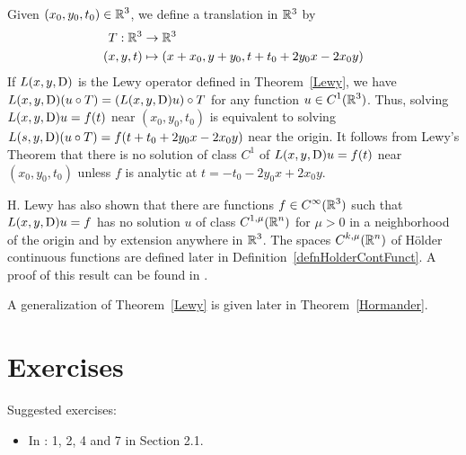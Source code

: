 \begin{rmk}
Given $\displaystyle (x_0,y_0,t_0) \in \mathbb{R}^3$, we define a translation
in $\mathbb{R}^3$ by
\begin{align*}
T:\mathbb{R}^3 &\to \mathbb{R}^3 \\
 (x,y,t) &\mapsto (x+x_0,y+y_0, t+t_0 +2y_0x - 2x_0 y)
\end{align*}
If $L(x,y,\operatorname{D})$ is the Lewy operator defined in Theorem~\ref{Lewy}, we have
$\displaystyle L(x,y,\operatorname{D})(u \circ T) = \left(L(x,y,\operatorname{D})u\right) \circ T$
for any function $\displaystyle u \in C^1(\mathbb{R}^3)$.
Thus, solving $L(x,y,\operatorname{D})u = f(t)$ near $(x_0,y_0,t_0)$ is
equivalent to solving $L(s,y,\operatorname{D})(u\circ T) = f(t+t_0+2y_0x - 2x_0y)$
near the origin.  It follows from Lewy's Theorem that there is no solution of
class $C^1$ of $L(x,y,\operatorname{D})u = f(t)$ near $(x_0,y_0,t_0)$ unless $f$ is
analytic at $t=-t_0-2y_0x + 2x_0y$.

H. Lewy has also shown that there are functions
$\displaystyle f \in C^{\infty}(\mathbb{R}^3)$
such that $L(x,y,\operatorname{D})u = f$ has no solution $u$ of class
$\displaystyle C^{1,\mu}(\mathbb{R}^n)$ for $\mu > 0$ in a neighborhood of
the origin and by extension anywhere in $\displaystyle \mathbb{R}^3$.  The spaces
$\displaystyle C^{k,\mu}(\mathbb{R}^n)$ of Hölder continuous functions are
defined later in Definition~\ref{defnHolderContFunct}.  A proof of
this result can be found in \cite{Smo}.
\end{rmk}

A generalization of Theorem~\ref{Lewy} is given later in
Theorem~\ref{Hormander}.

\section{Exercises}

Suggested exercises:

\begin{itemize}
\item In \cite{McO}: 1, 2, 4 and 7 in Section 2.1.
\end{itemize}


